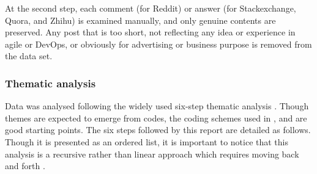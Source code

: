 \documentclass[
  12pt,
  a4paper,
]{article}
\begin{document}
At the second step, each comment (for Reddit) or answer (for
Stackexchange, Quora, and Zhihu) is examined manually, and only genuine
contents are preserved. Any post that is too short, not reflecting any
idea or experience in agile or DevOps, or obviously for advertising or
business purpose is removed from the data set.

\hypertarget{thematic-analysis}{%
\subsubsection{Thematic analysis}\label{thematic-analysis}}

Data was analysed following the widely used six-step thematic analysis
\citep{braun:2006:thematic-psy} \citep{Maguire:2017}. Though themes are
expected to emerge from codes, the coding schemes used in
\citep{bang2013ksa}, \citep{Jabbari:2016:what-is-devops} and
\citep{hussain2017nz} are good starting points. The six steps followed
by this report are detailed as follows. Though it is presented as an
ordered list, it is important to notice that this analysis is a
recursive rather than linear approach which requires moving back and
forth \citep{braun:2006:thematic-psy}.
\end{document}
